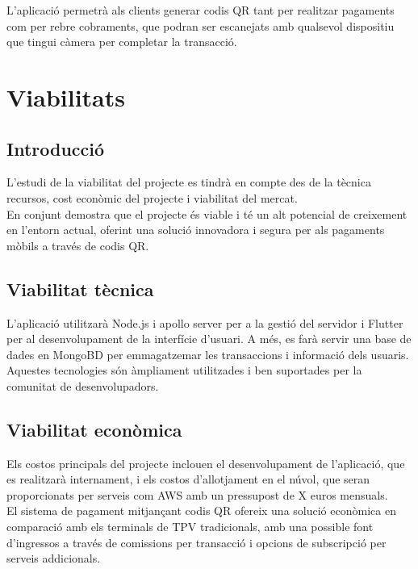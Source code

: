 \documentclass[a4paper,12pt,twoside]{ThesisStyle}
\begin{document}
L'aplicació permetrà als clients generar codis QR tant per realitzar pagaments com per rebre cobraments, que podran ser escanejats amb qualsevol dispositiu que tingui càmera per completar la transacció.


\chapter{Viabilitats}
\label{chp:viabilitats}

\section{Introducció}
\label{subsec: Introducció}

L'estudi de la viabilitat del projecte es tindrà en compte des de la tècnica
recursos, cost econòmic del projecte i viabilitat del mercat.\\

En conjunt demostra que el projecte és viable i té un alt potencial de creixement en l'entorn actual, oferint una solució innovadora i segura per als pagaments mòbils a través de codis QR.

\section{Viabilitat tècnica}
\label{subsec:Viabilitat tècnica}

L'aplicació utilitzarà Node.js i apollo server per a la gestió del servidor i Flutter per al desenvolupament de la interfície d'usuari. A més, es farà servir una base de dades en MongoBD per emmagatzemar les transaccions i informació dels usuaris. Aquestes tecnologies són àmpliament utilitzades i ben suportades per la comunitat de desenvolupadors.

\section{Viabilitat econòmica}
\label{subsec:Viabilitat económica}

Els costos principals del projecte inclouen el desenvolupament de l'aplicació, que es realitzarà internament, i els costos d'allotjament en el núvol, que seran proporcionats per serveis com AWS amb un pressupost de X euros mensuals.\\

El sistema de pagament mitjançant codis QR ofereix una solució econòmica en comparació amb els terminals de TPV tradicionals, amb una possible font d'ingressos a través de comissions per transacció i opcions de subscripció per serveis addicionals.
\end{document}
